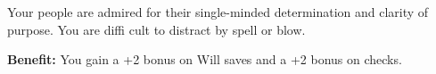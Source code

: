 
Your people are admired for their single-minded determination and clarity of purpose. You are diffi cult to distract by spell or blow.

\textbf{Benefit:} You gain a +2 bonus on Will saves and a +2 bonus on  checks.